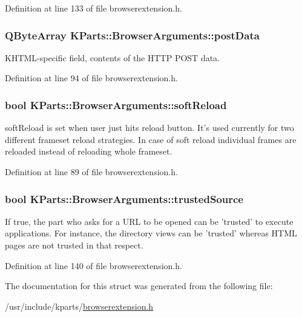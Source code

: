 \-Definition at line 133 of file browserextension.\-h.

\hypertarget{structKParts_1_1BrowserArguments_a9c1fb6cb602a10fec4ca05a25f1b9ac6}{
\subsubsection[{post\-Data}]{\setlength{\rightskip}{0pt plus 5cm}\-Q\-Byte\-Array {\bf \-K\-Parts\-::\-Browser\-Arguments\-::post\-Data}}}\label{structKParts_1_1BrowserArguments_a9c1fb6cb602a10fec4ca05a25f1b9ac6}
\-K\-H\-T\-M\-L-\/specific field, contents of the \-H\-T\-T\-P \-P\-O\-S\-T data. 

\-Definition at line 94 of file browserextension.\-h.

\hypertarget{structKParts_1_1BrowserArguments_af06b08da058cd6fc19ad42e2904e2594}{
\subsubsection[{soft\-Reload}]{\setlength{\rightskip}{0pt plus 5cm}bool {\bf \-K\-Parts\-::\-Browser\-Arguments\-::soft\-Reload}}}\label{structKParts_1_1BrowserArguments_af06b08da058cd6fc19ad42e2904e2594}
{\ttfamily soft\-Reload} is set when user just hits reload button. \-It's used currently for two different frameset reload strategies. \-In case of soft reload individual frames are reloaded instead of reloading whole frameset. 

\-Definition at line 89 of file browserextension.\-h.

\hypertarget{structKParts_1_1BrowserArguments_aa9e31eabaee6af2692319d21721fc9cb}{
\subsubsection[{trusted\-Source}]{\setlength{\rightskip}{0pt plus 5cm}bool {\bf \-K\-Parts\-::\-Browser\-Arguments\-::trusted\-Source}}}\label{structKParts_1_1BrowserArguments_aa9e31eabaee6af2692319d21721fc9cb}
\-If true, the part who asks for a \-U\-R\-L to be opened can be 'trusted' to execute applications. \-For instance, the directory views can be 'trusted' whereas \-H\-T\-M\-L pages are not trusted in that respect. 

\-Definition at line 140 of file browserextension.\-h.



\-The documentation for this struct was generated from the following file\-:\begin{DoxyCompactItemize}
\item 
/usr/include/kparts/\hyperlink{browserextension_8h}{browserextension.\-h}\end{DoxyCompactItemize}
